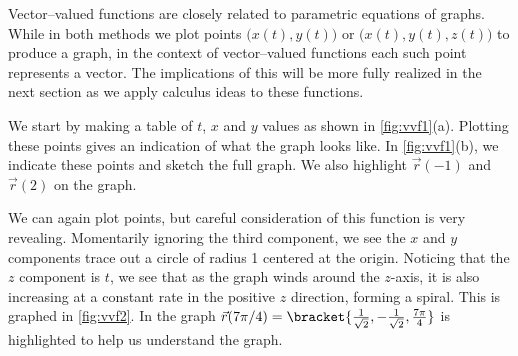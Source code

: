 Vector--valued functions are closely related to parametric equations of graphs. While in both methods we plot points $\big(x(t), y(t)\big)$ or $\big(x(t),y(t),z(t)\big)$ to produce a graph, in the context of vector--valued functions each such point represents a vector. The implications of this will be more fully realized in the next section as we apply calculus ideas to these functions.


{We start by making a table of $t$, $x$ and $y$ values as shown in \autoref{fig:vvf1}(a). Plotting these points gives an indication of what the graph looks like. In \autoref{fig:vvf1}(b), we indicate these points and sketch the full graph. We also highlight $\vec r(-1)$ and $\vec r(2)$ on the graph.}


{We can again plot points, but careful consideration of this function is very revealing. Momentarily ignoring the third component, we see the $x$ and $y$ components trace out a circle of radius 1 centered at the origin. Noticing that the $z$ component is $t$, we see that as the graph winds around the $z$-axis, it is also increasing at a constant rate in the positive $z$ direction, forming a spiral. This is graphed in \autoref{fig:vvf2}. In the graph $\vec r(7\pi/4)=\bracket{\frac1{\sqrt2},-\frac1{\sqrt2},\frac{7\pi}4}%
$ is highlighted to help us understand the graph.}

